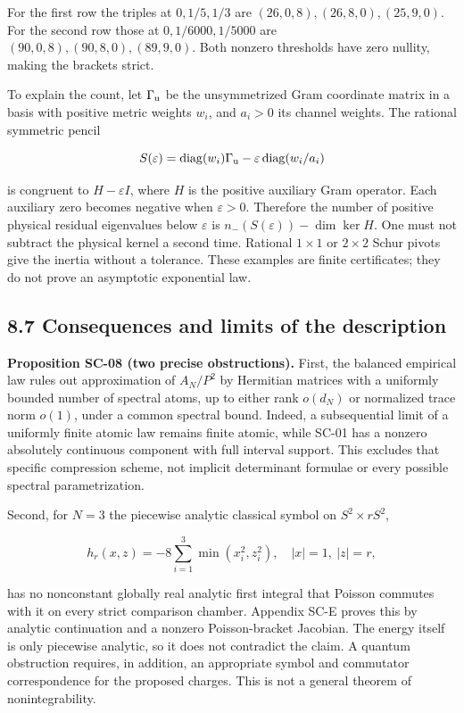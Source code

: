 \documentclass[a4paper,11pt]{article}
\numberwithin{equation}{section}
\begin{document}
For the first row the triples at \(0,1/5,1/3\) are \((26,0,8),(26,8,0),(25,9,0)\). For the second row those at \(0,1/6000,1/5000\) are \((90,0,8),(90,8,0),(89,9,0)\). Both nonzero thresholds have zero nullity, making the brackets strict.

To explain the count, let \(\Gamma_{\rm u}\) be the unsymmetrized Gram coordinate matrix in a basis with positive metric weights \(w_i\), and \(a_i>0\) its channel weights. The rational symmetric pencil

\[
S(\varepsilon)=\operatorname{diag}(w_i)\Gamma_{\rm u}
-\varepsilon\operatorname{diag}(w_i/a_i)
\]

is congruent to \(H-\varepsilon I\), where \(H\) is the positive auxiliary Gram operator. Each auxiliary zero becomes negative when \(\varepsilon>0\). Therefore the number of positive physical residual eigenvalues below \(\varepsilon\) is \(n_-(S(\varepsilon))-\dim\ker H\). One must not subtract the physical kernel a second time. Rational \(1\times1\) or \(2\times2\) Schur pivots give the inertia without a tolerance. These examples are finite certificates; they do not prove an asymptotic exponential law.

\hypertarget{consequences-and-limits-of-the-description}{%
\subsection{8.7 Consequences and limits of the description}\label{consequences-and-limits-of-the-description}}

\textbf{Proposition SC-08 (two precise obstructions).} First, the balanced empirical law rules out approximation of \(A_N/P^2\) by Hermitian matrices with a uniformly bounded number of spectral atoms, up to either rank \(o(d_N)\) or normalized trace norm \(o(1)\), under a common spectral bound. Indeed, a subsequential limit of a uniformly finite atomic law remains finite atomic, while SC-01 has a nonzero absolutely continuous component with full interval support. This excludes that specific compression scheme, not implicit determinant formulae or every possible spectral parametrization.

Second, for \(N=3\) the piecewise analytic classical symbol on \(S^2\times rS^2\),

\[
h_r(x,z)=-8\sum_{i=1}^3\min(x_i^2,z_i^2),
\quad |x|=1,\ |z|=r,
\]

has no nonconstant globally real analytic first integral that Poisson commutes with it on every strict comparison chamber. Appendix SC-E proves this by analytic continuation and a nonzero Poisson-bracket Jacobian. The energy itself is only piecewise analytic, so it does not contradict the claim. A quantum obstruction requires, in addition, an appropriate symbol and commutator correspondence for the proposed charges. This is not a general theorem of nonintegrability.
\end{document}
